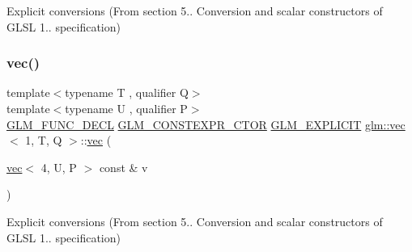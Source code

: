 Explicit conversions (From section 5.. Conversion and scalar constructors of G\+L\+SL 1.. specification) 

\mbox{\label{structglm_1_1vec_3_011_00_01_t_00_01_q_01_4_afe3da36b0ef8bf292c65f2846dc6db9a}} 
\subsubsection{\texorpdfstring{vec()}{vec()}\hspace{0.1cm}{\footnotesize\ttfamily [7/14]}}
{\footnotesize\ttfamily template$<$typename T , qualifier Q$>$ \\
template$<$typename U , qualifier P$>$ \\
\mbox{\hyperlink{setup_8hpp_ab2d052de21a70539923e9bcbf6e83a51}{G\+L\+M\+\_\+\+F\+U\+N\+C\+\_\+\+D\+E\+CL}} \mbox{\hyperlink{setup_8hpp_ad34178a09666081abdb573c14d1f4a5a}{G\+L\+M\+\_\+\+C\+O\+N\+S\+T\+E\+X\+P\+R\+\_\+\+C\+T\+OR}} \mbox{\hyperlink{setup_8hpp_a6c74f5a5e7b134ab69023ff9a30d4d5d}{G\+L\+M\+\_\+\+E\+X\+P\+L\+I\+C\+IT}} \mbox{\hyperlink{structglm_1_1vec}{glm\+::vec}}$<$ 1, T, Q $>$\+::\mbox{\hyperlink{structglm_1_1vec}{vec}} (\begin{DoxyParamCaption}\item[{\mbox{\hyperlink{structglm_1_1vec}{vec}}$<$ 4, U, P $>$ const \&}]{v }\end{DoxyParamCaption})}



Explicit conversions (From section 5.. Conversion and scalar constructors of G\+L\+SL 1.. specification) 

\mbox{\label{structglm_1_1vec_3_011_00_01_t_00_01_q_01_4_abd93e6bf42d506d85f4aea0c5d92ecc2}} 
